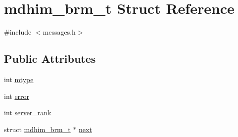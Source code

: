 \hypertarget{structmdhim__brm__t}{\section{mdhim\-\_\-brm\-\_\-t Struct Reference}
\label{de/d70/structmdhim__brm__t}
}


{\ttfamily \#include $<$messages.\-h$>$}

\subsection*{Public Attributes}
\begin{DoxyCompactItemize}
\item 
int \hyperlink{structmdhim__brm__t_abec78e9a1df09e0c2895c51edcacf59e}{mtype}
\item 
int \hyperlink{structmdhim__brm__t_ae52738aa96be251a3565ba89b11364f4}{error}
\item 
int \hyperlink{structmdhim__brm__t_a909ab473a5cde03aac89c5ef6aabc7cd}{server\-\_\-rank}
\item 
struct \hyperlink{structmdhim__brm__t}{mdhim\-\_\-brm\-\_\-t} $\ast$ \hyperlink{structmdhim__brm__t_ae3a86c1cd3f91266fccf3a90dd5798d5}{next}
\end{DoxyCompactItemize}


